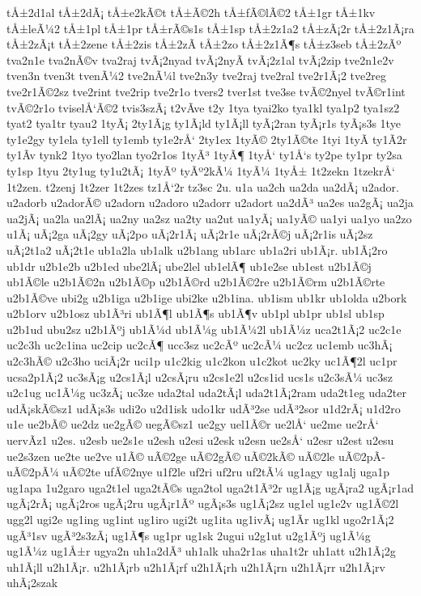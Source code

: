 {tÅ±2d1al
tÅ±2dÃ¡
tÅ±e2kÃ©t
tÅ±Ã©2h
tÅ±fÃ©lÃ©2
tÅ±1gr
tÅ±1kv
tÅ±leÃ¼2
tÅ±1pl
tÅ±1pr
tÅ±rÃ©s1s
tÅ±1sp
tÅ±2z1a2
tÅ±zÃ¡2r
tÅ±2z1Ã¡ra
tÅ±2zÃ¡t
tÅ±2zene
tÅ±2zis
tÅ±2zÃ­
tÅ±2zo
tÅ±2z1Ã¶s
tÅ±z3seb
tÅ±2zÃº
tva2n1e
tva2nÃ©v
tva2raj
tvÃ¡2nyad
tvÃ¡2nyÃ­
tvÃ¡2z1al
tvÃ¡2zip
tve2n1e2v
tven3n
tven3t
tvenÃ¼2
tve2nÃ¼l
tve2n3y
tve2raj
tve2ral
tve2r1Ã¡2
tve2reg
tve2r1Ã©2sz
tve2rint
tve2rip
tve2r1o
tvers2
tver1st
tve3se
tvÃ©2nyel
tvÃ©r1int
tvÃ©2r1o
tviselÅ‘Ã©2
tvis3szÃ¡
t2vÃ­ve
t2y
1tya
tyai2ko
tya1kl
tya1p2
tya1sz2
tyat2
tya1tr
tyau2
1tyÃ¡
2ty1Ã¡g
ty1Ã¡ld
ty1Ã¡ll
tyÃ¡2ran
tyÃ¡r1s
tyÃ¡s3s
1tye
ty1e2gy
ty1ela
ty1ell
ty1emb
ty1e2rÅ‘
2ty1ex
1tyÃ©
2ty1Ã©te
1tyi
1tyÃ­
ty1Ã­2r
ty1Ã­v
tynk2
1tyo
tyo2lan
tyo2r1os
1tyÃ³
1tyÃ¶
1tyÅ‘
ty1Å‘s
ty2pe
ty1pr
ty2sa
ty1sp
1tyu
2ty1ug
ty1u2tÃ¡
1tyÃº
tyÃº2kÃ¼
1tyÃ¼
1tyÅ±
1t2zekn
1tzekrÅ‘
1t2zen.
t2zenj
1t2zer
1t2zes
tz1Å‘2r
tz3sc
2u.
u1a
ua2ch
ua2da
ua2dÃ¡
u2ador.
u2adorb
u2adorÃ©
u2adorn
u2adoro
u2adorr
u2adort
ua2dÃ³
ua2es
ua2gÃ¡
ua2ja
ua2jÃ¡
ua2la
ua2lÃ¡
ua2ny
ua2sz
ua2ty
ua2ut
ua1yÃ¡
ua1yÃ©
ua1yi
ua1yo
ua2zo
u1Ã¡
uÃ¡2ga
uÃ¡2gy
uÃ¡2po
uÃ¡2r1Ã¡
uÃ¡2r1e
uÃ¡2rÃ©j
uÃ¡2r1is
uÃ¡2sz
uÃ¡2t1a2
uÃ¡2t1e
ub1a2la
ub1alk
u2b1ang
ub1arc
ub1a2ri
ub1Ã¡r.
ub1Ã¡2ro
ub1dr
u2b1e2b
u2b1ed
ube2lÃ¡
ube2lel
ub1elÃ¶
ub1e2se
ub1est
u2b1Ã©j
ub1Ã©le
u2b1Ã©2n
u2b1Ã©p
u2b1Ã©rd
u2b1Ã©2re
u2b1Ã©rm
u2b1Ã©rte
u2b1Ã©ve
ubi2g
u2b1iga
u2b1ige
ubi2ke
u2b1ina.
ub1ism
ub1kr
ub1olda
u2bork
u2b1orv
u2b1osz
ub1Ã³ri
ub1Ã¶l
ub1Ã¶s
ub1Ã¶v
ub1pl
ub1pr
ub1sl
ub1sp
u2b1ud
ubu2sz
u2b1Ãºj
ub1Ã¼d
ub1Ã¼g
ub1Ã¼2l
ub1Ã¼z
uca2t1Ã¡2
uc2c1e
uc2c3h
uc2c1ina
uc2cip
uc2cÃ¶
ucc3sz
uc2cÃº
uc2cÃ¼
uc2cz
uc1emb
uc3hÃ¡
u2c3hÃ©
u2c3ho
uciÃ¡2r
uci1p
u1c2kig
u1c2kon
u1c2kot
uc2ky
uc1Ã¶2l
uc1pr
ucsa2p1Ã¡2
uc3sÃ¡g
u2cs1Ã¡l
u2csÃ¡ru
u2cs1e2l
u2cs1id
ucs1s
u2c3sÃ¼
uc3sz
u2c1ug
uc1Ã¼g
uc3zÃ¡
uc3ze
uda2tal
uda2tÃ¡l
uda2t1Ã¡2ram
uda2t1eg
uda2ter
udÃ¡skÃ©sz1
udÃ¡s3s
udi2o
u2d1isk
udo1kr
udÃ³2se
udÃ³2sor
u1d2rÃ¡
u1d2ro
u1e
ue2bÃ©
ue2dz
ue2gÃ©
uegÃ©sz1
ue2gy
uel1Ã©r
ue2lÅ‘
ue2me
ue2rÅ‘
uervÃ­z1
u2es.
u2esb
ue2s1e
u2esh
u2esi
u2esk
u2esn
ue2sÅ‘
u2esr
u2est
u2esu
ue2s3zen
ue2te
ue2ve
u1Ã©
uÃ©2ge
uÃ©2gÃ©
uÃ©2kÃ©
uÃ©2le
uÃ©2pÃ­
uÃ©2pÃ¼
uÃ©2te
ufÃ©2nye
u1f2le
uf2ri
uf2ru
uf2tÃ¼
ug1agy
ug1alj
uga1p
ug1apa
1u2garo
uga2t1el
uga2tÃ©s
uga2tol
uga2t1Ã³2r
ug1Ã¡g
ugÃ¡ra2
ugÃ¡r1ad
ugÃ¡2rÃ¡
ugÃ¡2ros
ugÃ¡2ru
ugÃ¡r1Ãº
ugÃ¡s3s
ug1Ã¡2sz
ug1el
ug1e2v
ug1Ã©2l
ugg2l
ugi2e
ug1ing
ug1int
ug1iro
ugi2t
ug1ita
ug1ivÃ¡
ug1Ã­r
ug1kl
ugo2r1Ã¡2
ugÃ³1sv
ugÃ³2s3zÃ¡
ug1Ã¶s
ug1pr
ug1sk
2ugui
u2g1ut
u2g1Ãºj
ug1Ã¼g
ug1Ã¼z
ug1Å±r
ugya2n
uh1a2dÃ³
uh1alk
uha2r1as
uha1t2r
uh1att
u2h1Ã¡2g
uh1Ã¡ll
u2h1Ã¡r.
u2h1Ã¡rb
u2h1Ã¡rf
u2h1Ã¡rh
u2h1Ã¡rn
u2h1Ã¡rr
u2h1Ã¡rv
uhÃ¡2szak
}

